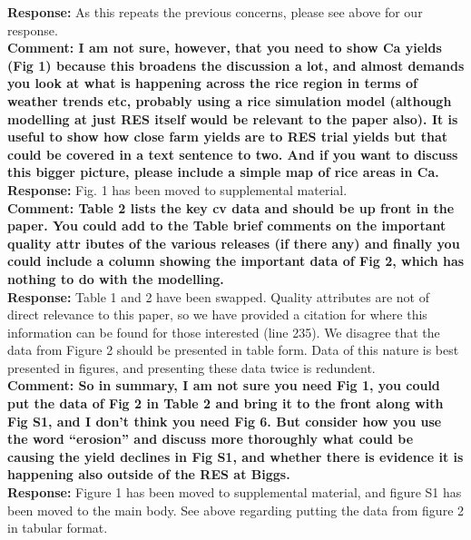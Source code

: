 \documentclass{article} \usepackage[margin=1in]{geometry}
\begin{document}
\textbf{Response:} As this repeats the previous concerns, please see
above for our response.\\

\textbf{Comment:  I am not sure, however, that you need to show Ca yields (Fig 1)
  because this broadens the discussion a lot, and almost demands you
  look at what is happening across the rice region in terms of weather
  trends etc, probably using a rice simulation model (although
  modelling at just RES itself would be relevant to the paper also). It
  is useful to show how close farm yields are to RES trial yields but
  that could be covered in a text sentence to two. And if you want to
  discuss this bigger picture, please include a simple map of rice
  areas in Ca.}\\

\textbf{Response:} Fig. 1 has been moved to supplemental material.\\

\textbf{Comment: Table 2 lists the key cv data and should be up front in the paper. You
  could add to the Table brief comments on the important quality attr
  ibutes of the various releases (if there any) and finally you could
  include a column showing the important data of Fig 2, which has
  nothing to do with the modelling.}\\

\textbf{Response:} Table 1 and 2 have been swapped. Quality attributes
are not of direct relevance to this paper, so we have provided a
citation for where this information can be found for those
interested (line 235). We disagree that the data from Figure 2 should be
presented in table form. Data of this nature is best presented in
figures, and presenting these data twice is redundent.\\

\textbf{Comment: So in summary, I am not sure you need Fig 1, you could put the data of
  Fig 2 in Table 2 and bring it to the front along with Fig S1, and I
  don’t think you need Fig 6. But consider how you use the word
  “erosion” and discuss more thoroughly what could be causing the yield
  declines in Fig S1, and whether there is evidence it is happening also
  outside of the RES at Biggs.}\\

\textbf{Response:} Figure 1 has been moved to supplemental material,
and figure S1 has been moved to the main body. See above regarding
putting the data from figure 2 in tabular format.\\
\end{document}
